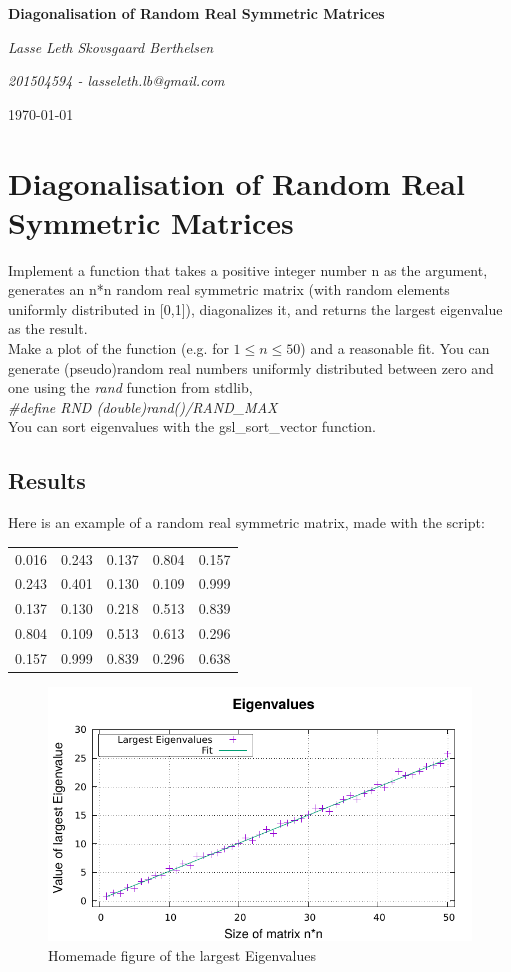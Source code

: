 \documentclass[12pt, a4paper, oneside]{article}
\begin{document}
\centering
{\huge\bfseries Diagonalisation of Random Real Symmetric Matrices \par}
\vspace{1cm}
{\Large\itshape Lasse Leth Skovsgaard Berthelsen \par}
{\Large\itshape 201504594 - lasseleth.lb@gmail.com \par}
{\large \today \par}
\flushleft
\section*{Diagonalisation of Random Real Symmetric Matrices}
Implement a function that takes a positive integer number n as the argument, generates an n*n random real symmetric matrix (with random elements uniformly distributed 
in [0,1]), diagonalizes it, and returns the largest eigenvalue as the result. \\
Make a plot of the function (e.g. for $1\leq n \leq50$) and a reasonable fit. You can generate (pseudo)random real numbers uniformly distributed between zero and one 
using the \emph{rand} function from stdlib,\\ 
\emph{\#define RND (double)rand()\slash RAND\_MAX}\\
You can sort eigenvalues with the gsl\_sort\_vector function.
\newpage
\subsection*{Results}
Here is an example of a random real symmetric matrix, made with the script:
\begin{table}[hb]
\begin{tabular}{lllll}
  0.016 & 0.243 & 0.137 & 0.804 & 0.157 \\
  0.243 & 0.401 & 0.130 & 0.109 & 0.999 \\
  0.137 & 0.130 & 0.218 & 0.513 & 0.839 \\
  0.804 & 0.109 & 0.513 & 0.613 & 0.296 \\
  0.157 & 0.999 & 0.839 & 0.296 & 0.638
\end{tabular}
\end{table}

\begin{figure}[ht]
\begin{centering}
\includegraphics[width=\linewidth]{plot.pdf}
\caption{Homemade figure of the largest Eigenvalues}
\label{fig:1}
\end{centering}
\end{figure}
\end{document}
